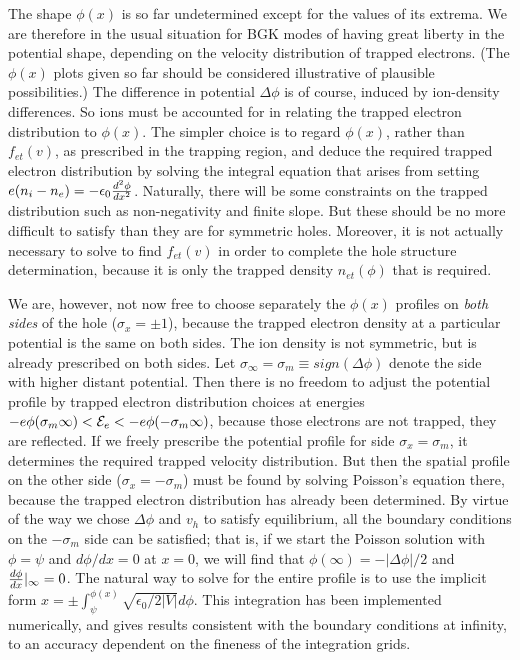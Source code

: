\documentclass[12pt]{article}
\def\energy{{\cal E}}
\begin{document}
The shape $\phi(x)$ is so far undetermined except for the values of
its extrema. We are therefore in the usual situation for BGK modes of
having great liberty in the potential shape, depending on the velocity
distribution of trapped electrons. (The $\phi(x)$ plots given so far
should be considered illustrative of plausible possibilities.) The
difference in potential $\Delta \phi$ is of course, induced by
ion-density differences. So ions must be accounted for in relating the
trapped electron distribution to $\phi(x)$. The simpler choice is to
regard $\phi(x)$, rather than $f_{et}(v)$, as prescribed in the
trapping region, and deduce the required trapped electron distribution
by solving the integral equation that arises from setting
$e(n_i-n_e)=-\epsilon_0{d^2\phi\over dx^2}$. Naturally, there will be
some constraints on the trapped distribution such as non-negativity
and finite slope. But these should be no more difficult to satisfy
than they are for symmetric holes. Moreover, it is not actually
necessary to solve to find $f_{et}(v)$ in order to complete the hole
structure determination, because it is only the trapped
density $n_{et}(\phi)$ that is required.

We are, however, not now free to choose separately the $\phi(x)$
profiles on \emph{both sides} of the hole ($\sigma_x=\pm1$), because
the trapped electron density at a particular potential is the same on
both sides. The ion density is not symmetric, but is already
prescribed on both sides. Let
$\sigma_\infty=\sigma_m\equiv sign(\Delta \phi)$ denote the side with
higher distant potential. Then there is no freedom to adjust the
potential profile by trapped electron distribution choices at energies
$-e\phi(\sigma_m\infty)<\energy_e<-e\phi(-\sigma_m\infty)$, because
those electrons are not trapped, they are reflected. If we freely
prescribe the potential profile for side $\sigma_x=\sigma_m$, it
determines the required trapped velocity distribution. But then the
spatial profile on the other side ($\sigma_x=-\sigma_m$) must be found
by solving Poisson's equation there, because the trapped electron
distribution has already been determined.  By virtue of the way we
chose $\Delta\phi$ and $v_h$ to satisfy equilibrium, all the boundary
conditions on the $-\sigma_m$ side can be satisfied; that is, if we
start the Poisson solution with $\phi=\psi$ and $d\phi/dx=0$ at $x=0$,
we will find that $\phi(\infty)=-|\Delta\phi|/2$ and
${d\phi\over dx}|_\infty=0$.  The natural way to solve for the entire
profile is to use the implicit form
$x=\pm\int_\psi^{\phi(x)} \sqrt{\epsilon_0/2|V|}d\phi$. This integration
has been implemented numerically, and gives results consistent with
the boundary conditions at infinity, to an accuracy dependent on the
fineness of the integration grids. 
\end{document}
